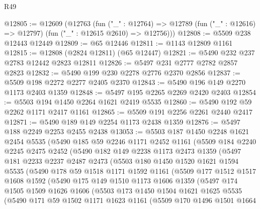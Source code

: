 \begin{lexlean}{R49}
\begin{coremodule}
@12805 := @12609
    (@12763
      (fun ("_" : @12764) =>
      @12789 (fun ("_" : @12616) => @12797) (fun ("_" : @12615 @2610) => @12756)))
@12808 := @5509 @238 @12443 @12449
@12809 := @65 @12446
@12811 := @1143 @12809 @1161
@12815 := @12808 (@2824 @12811) (@65 @12447)
@12821 := @5490 @232 @237 @2783 @12442 @2823 @12811
@12826 := @5497 @231 @2777 @2782 @2857 @2823
@12832 := @5490 @199 @230 @2278 @2776 @2370 @2856
@12837 := @5509 @198 @2272 @2277 @2405 @2370
@12843 := @5490 @196 @149 @2270 @1173 @2403 @1359
@12848 := @5497 @195 @2265 @2269 @2420 @2403
@12854 := @5503 @194 @1450 @2264 @1621 @2419 @5535
@12860 := @5490 @192 @59 @2262 @1171 @2417 @1161
@12865 := @5509 @191 @2256 @2261 @2440 @2417
@12871 := @5490 @189 @149 @2254 @1173 @2438 @1359
@12876 := @5497 @188 @2249 @2253 @2455 @2438
@13053 := @5503
    @187
    @1450
    @2248
    @1621
    @2454
    @5535
    (@5490
      @185
      @59
      @2246
      @1171
      @2452
      @1161
      (@5509
        @184
        @2240
        @2245
        @2475
        @2452
        (@5490
          @182
          @149
          @2238
          @1173
          @2473
          @1359
          (@5497
            @181
            @2233
            @2237
            @2487
            @2473
            (@5503
              @180
              @1450
              @1520
              @1621
              @1594
              @5535
              (@5490
                @178
                @59
                @1518
                @1171
                @1592
                @1161
                (@5509
                  @177
                  @1512
                  @1517
                  @1608
                  @1592
                  (@5490
                    @175
                    @149
                    @1510
                    @1173
                    @1606
                    @1359
                    (@5497
                      @174
                      @1505
                      @1509
                      @1626
                      @1606
                      (@5503
                        @173
                        @1450
                        @1504
                        @1621
                        @1625
                        @5535
                        (@5490
                          @171
                          @59
                          @1502
                          @1171
                          @1623
                          @1161
                          (@5509
                            @170
                            @1496
                            @1501
                            @1664

\end{coremodule}
\end{lexlean}
